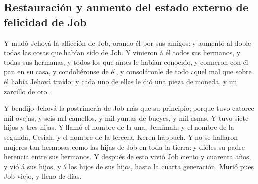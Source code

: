 \hypertarget{restauraciuxf3n-y-aumento-del-estado-externo-de-felicidad-de-job}{%
\subsection{Restauración y aumento del estado externo de felicidad de
Job}\label{restauraciuxf3n-y-aumento-del-estado-externo-de-felicidad-de-job}}

 Y mudó Jehová la aflicción de Job, orando él por sus
amigos: y aumentó al doble todas las cosas que habían sido de Job.
 Y vinieron á él todos sus hermanos, y todas sus
hermanas, y todos los que antes le habían conocido, y comieron con él
pan en su casa, y condoliéronse de él, y consoláronle de todo aquel mal
que sobre él había Jehová traído; y cada uno de ellos le dió una pieza
de moneda, y un zarcillo de oro.

 Y bendijo Jehová la postrimería de Job más que su
principio; porque tuvo catorce mil ovejas, y seis mil camellos, y mil
yuntas de bueyes, y mil asnas.  Y tuvo siete hijos y tres
hijas.  Y llamó el nombre de la una, Jemimah, y el nombre
de la segunda, Cesiah, y el nombre de la tercera, Keren-happuch.
 Y no se hallaron mujeres tan hermosas como las hijas de
Job en toda la tierra: y dióles su padre herencia entre sus hermanos.
 Y después de esto vivió Job ciento y cuarenta años, y
vió á sus hijos, y á los hijos de sus hijos, hasta la cuarta generación.
 Murió pues Job viejo, y lleno de días.
